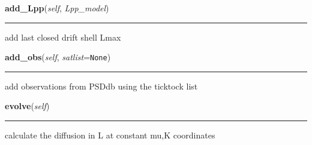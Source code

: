     \label{spacepy:radbelt:RBmodel:add_Lpp}

    \vspace{0.5ex}

\hspace{.8\funcindent}\begin{boxedminipage}{\funcwidth}

    \raggedright \textbf{add\_Lpp}(\textit{self}, \textit{Lpp\_model})

    \vspace{-1.5ex}

    \rule{\textwidth}{0.5\fboxrule}
\setlength{\parskip}{2ex}
    add last closed drift shell Lmax

\setlength{\parskip}{1ex}
    \end{boxedminipage}

    \label{spacepy:radbelt:RBmodel:add_obs}

    \vspace{0.5ex}

\hspace{.8\funcindent}\begin{boxedminipage}{\funcwidth}

    \raggedright \textbf{add\_obs}(\textit{self}, \textit{satlist}={\tt None})

    \vspace{-1.5ex}

    \rule{\textwidth}{0.5\fboxrule}
\setlength{\parskip}{2ex}
    add observations from PSDdb using the ticktock list

\setlength{\parskip}{1ex}
    \end{boxedminipage}

    \label{spacepy:radbelt:RBmodel:evolve}

    \vspace{0.5ex}

\hspace{.8\funcindent}\begin{boxedminipage}{\funcwidth}

    \raggedright \textbf{evolve}(\textit{self})

    \vspace{-1.5ex}

    \rule{\textwidth}{0.5\fboxrule}
\setlength{\parskip}{2ex}
    calculate the diffusion in L at constant mu,K coordinates

\setlength{\parskip}{1ex}
    \end{boxedminipage}


